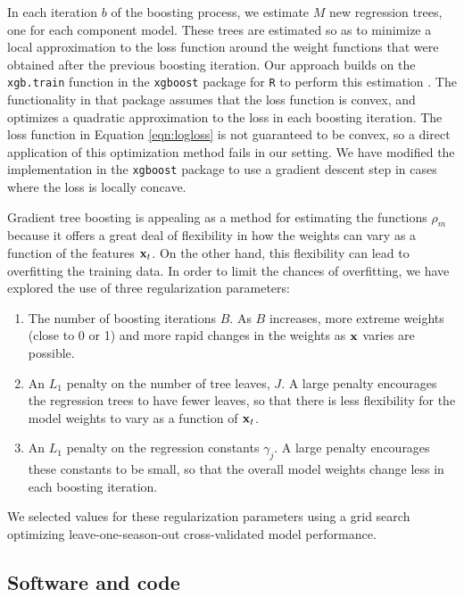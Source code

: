 \documentclass[10pt,letterpaper]{article}
\begin{document}
In each iteration \(b\) of the boosting process, we estimate \(M\) new
regression trees, one for each component model. These trees are
estimated so as to minimize a local approximation to the loss function
around the weight functions that were obtained after the previous
boosting iteration. Our approach builds on the \texttt{xgb.train}
function in the \texttt{xgboost} package for \texttt{R} to perform this
estimation \cite{xgboost}. The functionality in that package assumes
that the loss function is convex, and optimizes a quadratic
approximation to the loss in each boosting iteration. The loss function
in Equation \eqref{eqn:logloss} is not guaranteed to be convex, so a
direct application of this optimization method fails in our setting. We
have modified the implementation in the \texttt{xgboost} package to use
a gradient descent step in cases where the loss is locally concave.

Gradient tree boosting is appealing as a method for estimating the
functions \(\rho_m\) because it offers a great deal of flexibility in
how the weights can vary as a function of the features \({\bf x}_t\). On the
other hand, this flexibility can lead to overfitting the training data.
In order to limit the chances of overfitting, we have explored the use
of three regularization parameters:

\begin{enumerate}
\def\labelenumi{\arabic{enumi}.}
\item
  The number of boosting iterations \(B\). As \(B\) increases, more
  extreme weights (close to 0 or 1) and more rapid changes in the
  weights as \({\bf x}\) varies are possible.
\item
  An \(L_1\) penalty on the number of tree leaves, \(J\). A large
  penalty encourages the regression trees to have fewer leaves, so that
  there is less flexibility for the model weights to vary as a function
  of \({\bf x}_t\).
\item
  An \(L_1\) penalty on the regression constants \(\gamma_j\). A large
  penalty encourages these constants to be small, so that the overall
  model weights change less in each boosting iteration.
\end{enumerate}

We selected values for these regularization parameters using a grid
search optimizing leave-one-season-out cross-validated model
performance.

\subsection{Software and code}\label{software-and-code}
\end{document}
